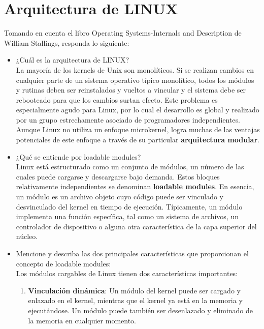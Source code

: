 \section{Arquitectura de LINUX}

	Tomando en cuenta el libro Operating Systems-Internals and Description de William Stallings, responda lo siguiente:

	\begin{itemize}

		\item ¿Cuál es la arquitectura de LINUX?
		\\La mayoría de los kernels de Unix son monolíticos. Si se realizan cambios en cualquier parte de un sistema operativo típico monolítico, todos los módulos y rutinas deben ser reinstalados y vueltos a vincular y el sistema debe ser rebooteado para que los cambios surtan efecto. Este problema es especialmente agudo para Linux, por lo cual el desarrollo es global y realizado por un grupo estrechamente asociado de programadores independientes.
Aunque Linux no utiliza un enfoque microkernel, logra muchas de las ventajas potenciales de este enfoque a través de su particular \textbf{arquitectura modular}. \\

		\item ¿Qué se entiende por loadable modules?
		\\Linux está estructurado como un conjunto de módulos, un número de las cuales puede cargarse y descargarse bajo demanda. Estos bloques relativamente independientes se denominan \textbf{loadable modules}.
En esencia, un módulo es un archivo objeto cuyo código puede ser vinculado y desvinculado del kernel en tiempo de ejecución. Típicamente, un módulo implementa una función específica, tal como un sistema de archivos, un controlador de dispositivo o alguna otra característica de la capa superior del núcleo.\\

		\item Mencione y describa las dos principales características que proporcionan el concepto de loadable modules:
		\\Los módulos cargables de Linux tienen dos características importantes:
\begin{enumerate}

	\item \textbf{Vinculación dinámica}: Un módulo del kernel puede ser cargado y enlazado en el kernel, mientras que el kernel ya está en la memoria y ejecutándose. Un módulo puede también ser desenlazado y eliminado de la memoria en cualquier momento.\\


\end{enumerate}
\end{itemize}
